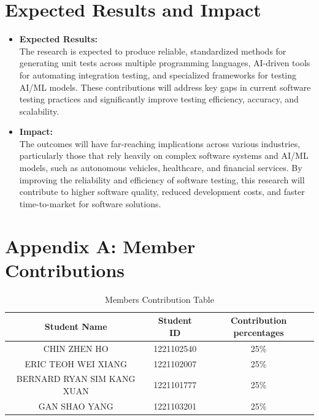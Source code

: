 \documentclass[12pt,a4paper]{article}
\begin{document}
\section{Expected Results and Impact}
\begin{itemize}
    \item \textbf{Expected Results:}\\
    The research is expected to produce reliable, standardized methods for generating unit tests across multiple programming languages, AI-driven tools for automating integration testing, and specialized frameworks for testing AI/ML models. These contributions will address key gaps in current software testing practices and significantly improve testing efficiency, accuracy, and scalability.

    \item \textbf{Impact:}\\
     The outcomes will have far-reaching implications across various industries, particularly those that rely heavily on complex software systems and AI/ML models, such as autonomous vehicles, healthcare, and financial services. By improving the reliability and efficiency of software testing, this research will contribute to higher software quality, reduced development costs, and faster time-to-market for software solutions.


\end{itemize}

\newpage
{} %

\appendix
\section{Appendix A: Member Contributions}
\begin{table}[h]
    \centering
    \begin{tabular}{|c|c|c|}
        \hline
        Student Name & Student ID & Contribution percentages \\
        \hline
        CHIN ZHEN HO & 1221102540 & 25\% \\
        \hline
        ERIC TEOH WEI XIANG & 1221102007 & 25\% \\
        \hline
        BERNARD RYAN SIM KANG XUAN & 1221101777 & 25\% \\
        \hline
        GAN SHAO YANG & 1221103201 & 25\% \\
        \hline

    \end{tabular}
    \caption{Members Contribution Table}
    \label{tab:my_label}
\end{table}
\end{document}
